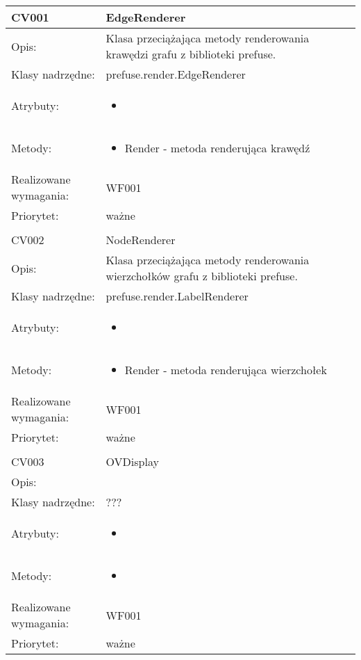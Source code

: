 \documentclass[a4paper,10pt]{article}
\begin{document}
\begin{center}
 

\begin{longtable}{|m{3cm}|m{9cm}|} \hline

CV001 & EdgeRenderer \\ \hline
Opis: & Klasa przeciążająca metody renderowania krawędzi grafu z biblioteki prefuse. \\ \hline
Klasy nadrzędne: &  prefuse.render.EdgeRenderer   \\ \hline
Atrybuty: & \begin{itemize}
 \item 
\end{itemize}
 \\ \hline
Metody: & \begin{itemize}
 \item Render - metoda renderująca krawędź
\end{itemize}
  \\ \hline
Realizowane wymagania: & WF001 \\ \hline
Priorytet: & ważne  \\ \hline

\multicolumn{2}{c}{} \\
 \hline

CV002 & NodeRenderer \\ \hline
Opis: & Klasa przeciążająca metody renderowania wierzchołków grafu z biblioteki prefuse.    \\ \hline
Klasy nadrzędne: &  prefuse.render.LabelRenderer   \\ \hline
Atrybuty: & \begin{itemize}
 \item 
\end{itemize}
 \\ \hline
Metody: & \begin{itemize}
 \item Render - metoda renderująca wierzchołek
\end{itemize}
  \\ \hline
Realizowane wymagania: & WF001 \\ \hline
Priorytet: & ważne  \\ \hline

\multicolumn{2}{c}{} \\
 \hline

CV003 & OVDisplay \\ \hline
Opis: &     \\ \hline
Klasy nadrzędne: &  ???   \\ \hline
Atrybuty: & \begin{itemize}
 \item 
\end{itemize}
 \\ \hline
Metody: & \begin{itemize}
 \item 
\end{itemize}
  \\ \hline
Realizowane wymagania: & WF001 \\ \hline
Priorytet: & ważne  \\ \hline


\end{longtable}
\end{center}
\end{document}
